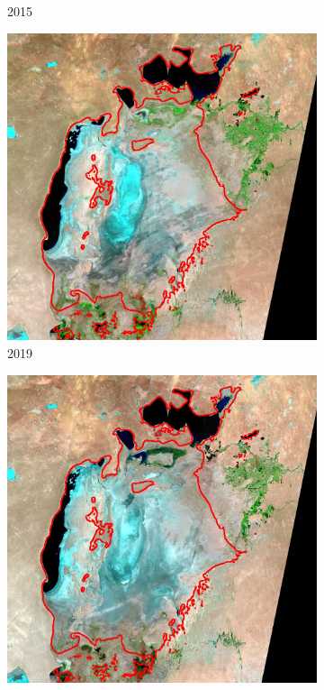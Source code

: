\documentclass[12pt,a4paper]{article}
\begin{document}
\begin{figure}
\begin{subfigure}[b]{0.19\textwidth}
        \caption{2015}
    \end{subfigure}
    \begin{subfigure}[b]{0.19\textwidth}
        \centering
        \includegraphics[width=\textwidth]{../img/2019o.jpg}
        \caption{2019}
    \end{subfigure}
    \begin{subfigure}[b]{0.19\textwidth}
        \centering
        \includegraphics[width=\textwidth]{../img/2021o.jpg}

\end{subfigure}
\end{figure}
\end{document}
